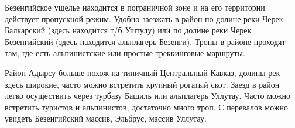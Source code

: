     Безенгийское ущелье находится в пограничной зоне и на его территории действует пропускной режим. Удобно заезжать в район по долине реки Черек Балкарский (здесь находится т/б Уштулу) или по долине реки
    Черек Безенгийский (здесь находится альплагерь Безенги). Тропы в районе проходят там, где есть альпинистские или простые
    треккинговые маршруты.

    Район Адырсу больше похож на типичный Центральный Кавказ, долины рек здесь широкие, часто можно встретить крупный рогатый скот. Заезд в
    район легко осуществить через турбазу Башиль или альплагерь Уллутау. Часто можно встретить туристов и альпинистов,
    достаточно много троп. С перевалов можно увидеть Безенгийский массив, Эльбрус, массив Уллутау.
